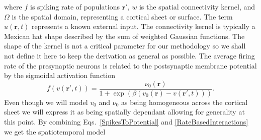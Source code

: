 \documentclass[onecolumn,draftcls]{IEEEtran}
\begin{document}
where $f$ is spiking rate of populations $\mathbf{r}'$, $w$ is the spatial connectivity kernel, and $\Omega$ is the spatial domain, representing a cortical sheet or surface. The term $u\left(\mathbf{r},t\right)$ represents a known external input. The connectivity kernel is typically a Mexican hat shape described by the sum of weighted Gaussian functions. The shape of the kernel is not a critical parameter for our methodology so we shall not define it here to keep the derivation as general as possible.
The average firing rate of the presynaptic neurons is related to the postsynaptic membrane potential by the sigmoidal activation function
\begin{equation}\label{ActivationFunction}
	f\left( v\left( \mathbf{r}', t \right) \right) = \frac{\nu _0\left(\mathbf{r}\right)}{1 + \exp \left( \beta \left( v_0\left( \mathbf{r} \right) - v\left(\mathbf{r}',t\right) \right) \right)}.
\end{equation}
Even though we will model $v_0$ and $\nu_0$ as being homogeneous across the cortical sheet we will express it as being spatially dependant allowing for generality at this point. By combining Eqs.~\ref{SpikesToPotential} and \ref{RateBasedInteractions} we get the spatiotemporal model
\end{document}
